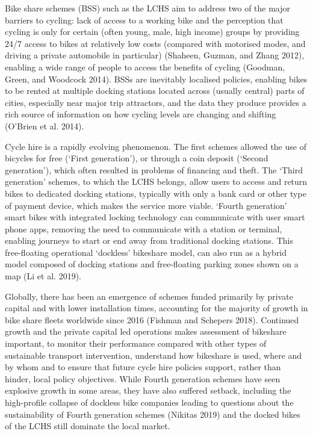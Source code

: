 \documentclass[
]{article}
\begin{document}
Bike share schemes (BSS) such as the LCHS aim to address two of the major barriers to cycling: lack of access to a working bike and the perception that cycling is only for certain (often young, male, high income) groups by providing 24/7 access to bikes at relatively low costs (compared with motorised modes, and driving a private automobile in particular) (Shaheen, Guzman, and Zhang 2012), enabling a wide range of people to access the benefits of cycling (Goodman, Green, and Woodcock 2014).
BSSs are inevitably localised policies, enabling bikes to be rented at multiple docking stations located across (usually central) parts of cities, especially near major trip attractors, and the data they produce provides a rich source of information on how cycling levels are changing and shifting (O'Brien et al. 2014).

Cycle hire is a rapidly evolving phenomenon.
The first schemes allowed the use of bicycles for free (`First generation'), or through a coin deposit (`Second generation'), which often resulted in problems of financing and theft.
The `Third generation' schemes, to which the LCHS belongs, allow users to access and return bikes to dedicated docking stations, typically with only a bank card or other type of payment device, which makes the service more viable.
`Fourth generation' smart bikes with integrated locking technology can communicate with user smart phone apps, removing the need to communicate with a station or terminal, enabling journeys to start or end away from traditional docking stations.
This free-floating operational `dockless' bikeshare model, can also run as a hybrid model composed of docking stations and free-floating parking zones shown on a map (Li et al. 2019).

Globally, there has been an emergence of schemes funded primarily by private capital and with lower installation times, accounting for the majority of growth in bike share fleets worldwide since 2016 (Fishman and Schepers 2018).
Continued growth and the private capital led operations makes assessment of bikeshare important, to monitor their performance compared with other types of sustainable transport intervention, understand how bikeshare is used, where and by whom and to ensure that future cycle hire policies support, rather than hinder, local policy objectives.
While Fourth generation schemes have seen explosive growth in some areas, they have also suffered setback, including the high-profile collapse of dockless bike companies leading to questions about the sustainability of Fourth generation schemes (Nikitas 2019) and the docked bikes of the LCHS still dominate the local market.
\end{document}
